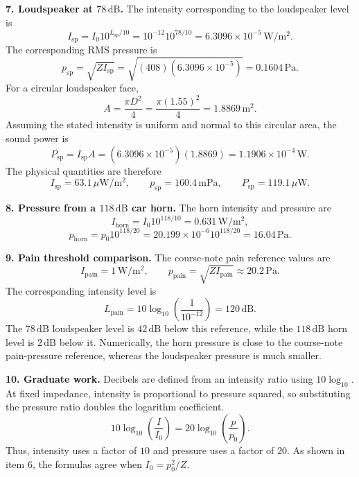\textbf{7. Loudspeaker at $78\,\mathrm{dB}$.} The intensity corresponding to the loudspeaker level is
\[
I_{\mathrm{sp}}=I_0 10^{L_{\mathrm{sp}}/10}
 =10^{-12}10^{78/10}
 =6.3096\times10^{-5}\,\mathrm{W/m^2}.
\]
The corresponding RMS pressure is
\[
p_{\mathrm{sp}}=\sqrt{ZI_{\mathrm{sp}}}
 =\sqrt{(408)(6.3096\times10^{-5})}
 =0.1604\,\mathrm{Pa}.
\]
For a circular loudspeaker face,
\[
A=\frac{\pi D^2}{4}=\frac{\pi(1.55)^2}{4}=1.8869\,\mathrm{m^2}.
\]
Assuming the stated intensity is uniform and normal to this circular area, the sound power is
\[
P_{\mathrm{sp}}=I_{\mathrm{sp}}A
 =(6.3096\times10^{-5})(1.8869)
 =1.1906\times10^{-4}\,\mathrm{W}.
\]
The physical quantities are therefore
\[
\boxed{I_{\mathrm{sp}}=63.1\,\mu\mathrm{W/m^2},\qquad
p_{\mathrm{sp}}=160.4\,\mathrm{mPa},\qquad
P_{\mathrm{sp}}=119.1\,\mu\mathrm{W}.}
\]

\textbf{8. Pressure from a $118\,\mathrm{dB}$ car horn.} The horn intensity and pressure are
\[
I_{\mathrm{horn}}=I_0 10^{118/10}=0.631\,\mathrm{W/m^2},
\]
\[
p_{\mathrm{horn}}=p_0 10^{118/20}
 =20.199\times10^{-6}10^{118/20}
 =\boxed{16.04\,\mathrm{Pa}.}
\]

\textbf{9. Pain threshold comparison.} The course-note pain reference values are
\[
\boxed{I_{\mathrm{pain}}=1\,\mathrm{W/m^2},\qquad
p_{\mathrm{pain}}=\sqrt{ZI_{\mathrm{pain}}}\approx20.2\,\mathrm{Pa}.}
\]
The corresponding intensity level is
\[
L_{\mathrm{pain}}=10\log_{10}\left(\frac{1}{10^{-12}}\right)=120\,\mathrm{dB}.
\]
The $78\,\mathrm{dB}$ loudspeaker level is $42\,\mathrm{dB}$ below this reference, while the $118\,\mathrm{dB}$ horn level is $2\,\mathrm{dB}$ below it. Numerically, the horn pressure is close to the course-note pain-pressure reference, whereas the loudspeaker pressure is much smaller.

\textbf{10. Graduate work.} Decibels are defined from an intensity ratio using $10\log_{10}$. At fixed impedance, intensity is proportional to pressure squared, so substituting the pressure ratio doubles the logarithm coefficient.
\[
10\log_{10}\left(\frac{I}{I_0}\right)
=20\log_{10}\left(\frac{p}{p_0}\right).
\]
Thus, intensity uses a factor of $10$ and pressure uses a factor of $20$. As shown in item 6, the formulas agree when $I_0=p_0^2/Z$.

\clearpage
{}

\endgroup
